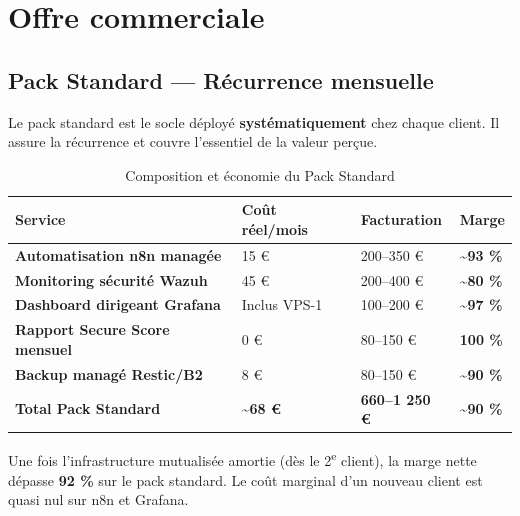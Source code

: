 \section{Offre commerciale}

\subsection{Pack Standard — Récurrence mensuelle}

Le pack standard est le socle déployé \textbf{systématiquement} chez chaque client. Il assure la récurrence et couvre l'essentiel de la valeur perçue.

\begin{table}[htbp]
  \centering
  \caption{Composition et économie du Pack Standard}
  \renewcommand{\arraystretch}{1.5}
  \begin{tabularx}{\textwidth}{>{\bfseries}X p{2.5cm} p{2.5cm} p{1.8cm}}
    \toprule
    \rowcolor{tabheader}
    \color{white}Service & \color{white}Coût réel/mois & \color{white}Facturation & \color{white}Marge \\
    \midrule
    Automatisation n8n managée & 15 € & 200–350 € & \textcolor{colgreen}{\textbf{\~{}93 \%}} \\
    \rowcolor{rowgray}
    Monitoring sécurité Wazuh & 45 € & 200–400 € & \textcolor{colgreen}{\textbf{\~{}80 \%}} \\
    Dashboard dirigeant Grafana & Inclus VPS-1 & 100–200 € & \textcolor{colgreen}{\textbf{\~{}97 \%}} \\
    \rowcolor{rowgray}
    Rapport Secure Score mensuel & 0 € & 80–150 € & \textcolor{colgreen}{\textbf{100 \%}} \\
    Backup managé Restic/B2 & 8 € & 80–150 € & \textcolor{colgreen}{\textbf{\~{}90 \%}} \\
    \midrule
    \rowcolor{navydark}
    \color{white}\textbf{Total Pack Standard} & \color{white}\textbf{\~{}68 €} & \color{white}\textbf{660–1 250 €} & \color{white}\textbf{\~{}90 \%} \\
    \bottomrule
  \end{tabularx}
\end{table}

\begin{pointcle}
  Une fois l'infrastructure mutualisée amortie (dès le 2\textsuperscript{e} client), la marge nette dépasse \textbf{92 \%} sur le pack standard. Le coût marginal d'un nouveau client est quasi nul sur n8n et Grafana.
\end{pointcle}

